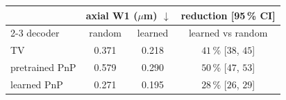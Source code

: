 \begin{tabular}{@{}l cc c@{}}\toprule
& \multicolumn{2}{c}{axial W1 ($\mu$m) $\downarrow$} & reduction [95\,\% CI]\\
\cmidrule(lr){2-3}
decoder & random & learned & learned vs random\\\midrule
TV & 0.371 & 0.218 & $41$\,\% [$38$, $45$]\\
pretrained PnP & 0.579 & 0.290 & $50$\,\% [$47$, $53$]\\
learned PnP & 0.271 & 0.195 & $28$\,\% [$26$, $29$]\\
\bottomrule\end{tabular}
